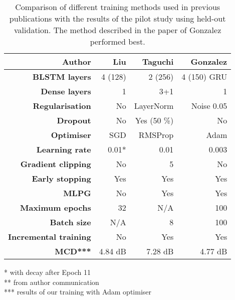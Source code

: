 \documentclass[a4paper]{article}
\begin{document}
%

\begin{table}[th]
  \caption{Comparison of different training methods used in previous publications with the
    results of the pilot study using held-out validation. The method described in the paper of
  Gonzalez performed best.}
  \label{tab:architectures}
  \centering
  \footnotesize

  \begin{tabular}{ r r r r }
    \toprule
    \textbf{Author} & \textbf{Liu} & \textbf{Taguchi} & \textbf{Gonzalez} \\
    \midrule
    \textbf{BLSTM layers} & 4 (128) & 2 (256) & 4 (150) GRU \\
    \textbf{Dense layers} & 1 & 3+1 & 1 \\
    \textbf{Regularisation} & No & LayerNorm & Noise 0.05 \\
    \textbf{Dropout} & No & Yes (50 \%) & No \\
    \textbf{Optimiser} & SGD & RMSProp & Adam \\
    \textbf{Learning rate} & 0.01* & 0.01 & 0.003 \\
    \textbf{Gradient clipping} & No & 5 & No \\
    \textbf{Early stopping} & Yes & Yes & Yes \\
    \textbf{MLPG} \cite{Wu2016} & No & Yes & Yes \\ 
    \textbf{Maximum epochs} & 32 & N/A & 100 \\
    \textbf{Batch size} & N/A & 8 & 100 \\
    \textbf{Incremental training} & No & Yes & Yes \\
    \textbf{MCD***} & 4.84 dB & 7.28 dB & 4.77 dB \\
    \bottomrule
  \end{tabular}
  * with decay after Epoch 11 \\
  ** from author communication \\
  *** results of our training with Adam optimiser
\end{table}
\end{document}
